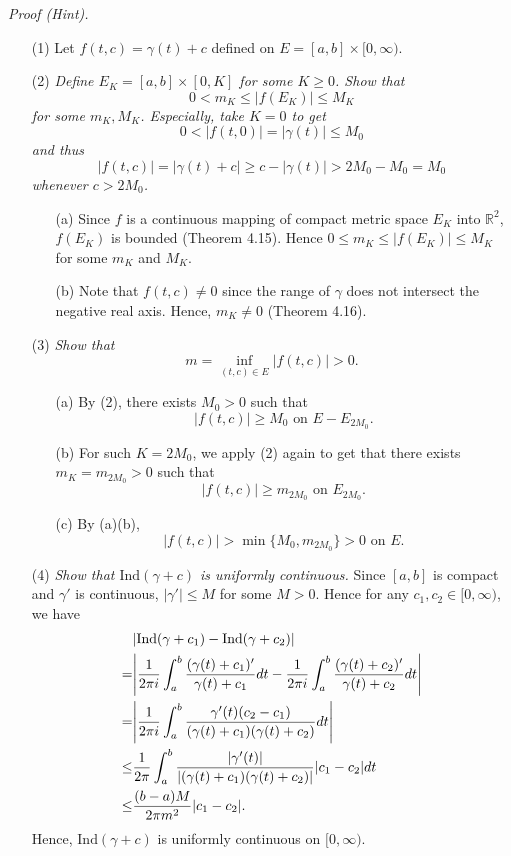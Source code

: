 \documentclass{article}
\begin{document}
\emph{Proof (Hint).}
\begin{enumerate}
\item[(1)]
Let $f(t,c) = \gamma(t) + c$ defined on $E = [a,b] \times [0,\infty)$.

\item[(2)]
\emph{Define $E_K = [a,b] \times [0,K]$ for some $K \geq 0$.
Show that
\[
  0 < m_K \leq |f(E_K)| \leq M_K
\]
for some $m_K, M_K$.
Especially, take $K = 0$ to get
\[
  0 < |f(t,0)| = |\gamma(t)| \leq M_0
\]
and thus
\[
  |f(t,c)| = |\gamma(t)+c| \geq c - |\gamma(t)| > 2M_0 - M_0 = M_0
\]
whenever $c > 2M_0$.}
  \begin{enumerate}
  \item[(a)]
    Since $f$ is a continuous mapping of compact metric space $E_K$
    into $\mathbb{R}^2$, $f(E_K)$ is bounded (Theorem 4.15).
    Hence
    $0 \leq m_K \leq |f(E_K)| \leq M_K$
    for some $m_K$ and $M_K$.

  \item[(b)]
  Note that $f(t,c) \neq 0$
  since the range of $\gamma$ does not intersect the negative real axis.
  Hence, $m_K \neq 0$ (Theorem 4.16).
  \end{enumerate}

\item[(3)]
\emph{Show that
\[
  m = \inf_{(t,c) \in E} |f(t,c)| > 0.
\]}
  \begin{enumerate}
  \item[(a)]
  By (2), there exists $M_0 > 0$ such that
  \[
    |f(t,c)| \geq M_0 \text{ on } E - E_{2M_0}.
  \]

  \item[(b)]
  For such $K = 2M_0$, we apply (2) again to get that
  there exists $m_K = m_{2M_0} > 0$ such that
  \[
    |f(t,c)| \geq m_{2M_0} \text{ on } E_{2M_0}.
  \]

  \item[(c)]
  By (a)(b),
  \[
    |f(t,c)| > \min\{M_0,m_{2M_0}\} > 0 \text{ on } E.
  \]
  \end{enumerate}

\item[(4)]
  \emph{Show that $\mathrm{Ind}(\gamma+c)$ is uniformly continuous.}
  Since $[a,b]$ is compact and $\gamma'$ is continuous,
  $|\gamma'| \leq M$ for some $M > 0$.
  Hence for any $c_1, c_2 \in [0,\infty)$, we have
  \begin{align*}
    &\abs{ \mathrm{Ind}(\gamma+c_1) - \mathrm{Ind}(\gamma+c_2) } \\
    =& \abs{ \frac{1}{2\pi i}\int_{a}^{b} \frac{(\gamma(t)+c_1)'}{\gamma(t)+c_1} dt
      - \frac{1}{2\pi i}\int_{a}^{b} \frac{(\gamma(t)+c_2)'}{\gamma(t)+c_2} dt } \\
    =& \abs{ \frac{1}{2\pi i}\int_{a}^{b}
        \frac{\gamma'(t)(c_2-c_1)}{(\gamma(t)+c_1)(\gamma(t)+c_2)} dt } \\
    \leq& \frac{1}{2\pi} \int_{a}^{b}
        \frac{|\gamma'(t)|}{|(\gamma(t)+c_1)(\gamma(t)+c_2)|} |c_1-c_2|dt \\
    \leq& \frac{(b-a)M}{2\pi m^2} |c_1-c_2|.
  \end{align*}
  Hence, $\mathrm{Ind}(\gamma+c)$ is uniformly continuous on $[0,\infty)$.


\end{enumerate}
\end{document}
